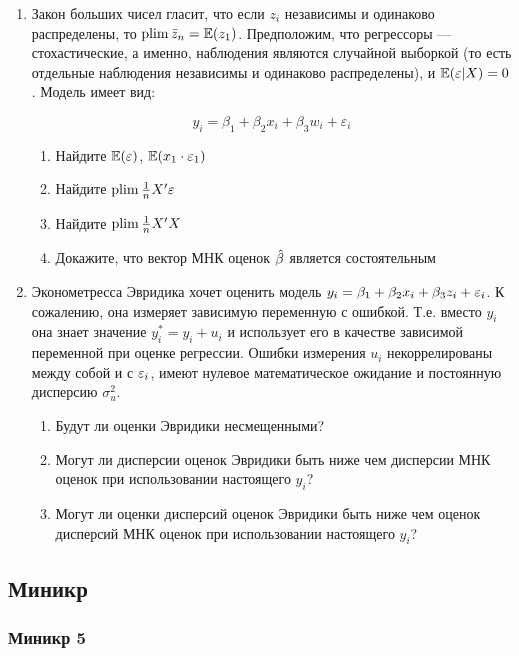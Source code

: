 \documentclass[12pt, a4paper]{article}\usepackage[]{graphicx}\usepackage[]{color}
\begin{document}
\begin{enumerate}
\item Закон больших чисел гласит, что если $z_i$ независимы и одинаково распределены, то $\operatorname*{plim} \bar{z}_n = \mathbb{E}(z_1)$. Предположим, что регрессоры — стохастические, а именно, наблюдения являются случайной выборкой (то есть отдельные наблюдения независимы и одинаково распределены), и  $\mathbb{E}(\varepsilon | X)=0$. Модель имеет вид:

\[
y_i=\beta_1 + \beta_2 x_i +\beta_3 w_i +\varepsilon_i
\]

\begin{enumerate}
\item Найдите $\mathbb{E}(\varepsilon)$, $\mathbb{E}(x_1 \cdot \varepsilon_1)$
\item Найдите $\operatorname*{plim} \frac{1}{n}X'\varepsilon$
\item Найдите $\operatorname*{plim} \frac{1}{n}X'X$
\item Докажите, что вектор МНК оценок $\hat{\beta}$ является состоятельным
\end{enumerate}


\item Эконометресса Эвридика хочет оценить модель $y_i=\beta_1 + \beta_2 x_i +\beta_3 z_i + \varepsilon_i$. К сожалению, она измеряет зависимую переменную с ошибкой. Т.е. вместо $y_i$ она знает значение $y_i^*=y_i+u_i$ и использует его в качестве зависимой переменной при оценке регрессии. Ошибки измерения $u_i$ некоррелированы между собой и с $\varepsilon_i$, имеют нулевое математическое ожидание и постоянную дисперсию $\sigma^2_u$.
\begin{enumerate}
\item Будут ли оценки Эвридики несмещенными?
\item Могут ли дисперсии оценок Эвридики быть ниже чем дисперсии МНК оценок при использовании настоящего $y_i$?
\item Могут ли оценки дисперсий оценок Эвридики быть ниже чем оценок дисперсий МНК оценок при использовании настоящего $y_i$?
\end{enumerate}


\end{enumerate}

\subsection{Миникр}

\subsubsection*{Миникр 5}
\end{document}
